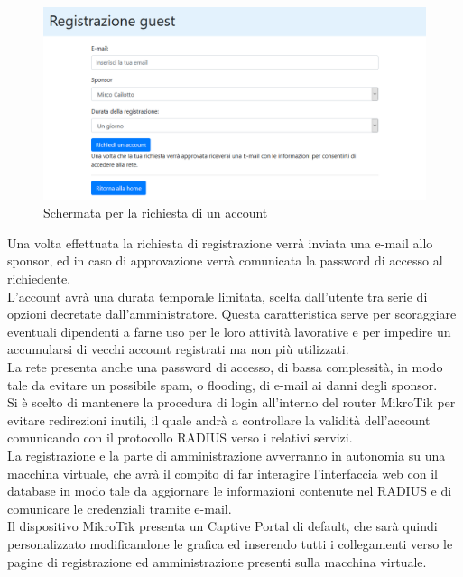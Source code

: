 \documentclass[Realizzazione.tex]{subfiles}
\begin{document}
\begin{figure}[H]
	\centering
	\includegraphics[width=1.1\linewidth]{"images/CaptivePortalReq"}
	\caption{Schermata per la richiesta di un account}
	\label{fig:Schermata per la richiesta di un account}
\end{figure}

Una volta effettuata la richiesta di registrazione verrà inviata una e-mail allo sponsor, ed in caso di approvazione verrà comunicata la password di accesso al richiedente. \\
L'account avrà una durata temporale limitata, scelta dall'utente tra serie di opzioni decretate dall'amministratore. Questa caratteristica serve per scoraggiare eventuali dipendenti a farne uso per le loro attività lavorative e per impedire un accumularsi di vecchi account registrati ma non più utilizzati. \\
\newpage
La rete presenta anche una password di accesso, di bassa complessità, in modo tale da evitare un possibile spam, o flooding, di e-mail ai danni degli sponsor. \\

Si è scelto di mantenere la procedura di login all'interno del router MikroTik per evitare redirezioni inutili, il quale andrà a controllare la validità dell'account comunicando con il protocollo RADIUS verso i relativi servizi. \\
La registrazione e la parte di amministrazione avverranno in autonomia su una macchina virtuale, che avrà il compito di far interagire l'interfaccia web con il database in modo tale da aggiornare le informazioni contenute nel RADIUS e di comunicare le credenziali tramite e-mail. \\

Il dispositivo MikroTik presenta un Captive Portal di default, che sarà quindi personalizzato modificandone le grafica ed inserendo tutti i collegamenti verso le pagine di registrazione ed amministrazione presenti sulla macchina virtuale. \\
\end{document}
